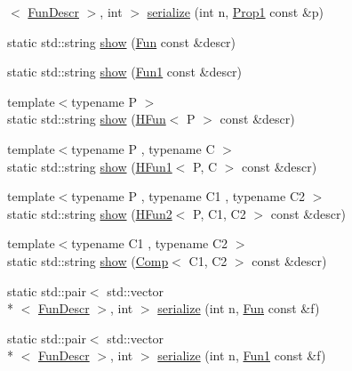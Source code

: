 \begin{DoxyCompactItemize}
$<$ \hyperlink{structpfq__lang_1_1FunDescr}{Fun\+Descr} $>$, int $>$ \hyperlink{namespacepfq__lang_1_1term_a4c143ee066b92bd8578432f7436026fb}{serialize} (int n, \hyperlink{structpfq__lang_1_1term_1_1Prop1}{Prop1} const \&p)
\item 
static std\+::string \hyperlink{namespacepfq__lang_1_1term_a2df94c2f5eb6ffb6ebd83f79b5c8008d}{show} (\hyperlink{structpfq__lang_1_1term_1_1Fun}{Fun} const \&descr)
\item 
static std\+::string \hyperlink{namespacepfq__lang_1_1term_a9d1a9154aa159b08768c01512719b89c}{show} (\hyperlink{structpfq__lang_1_1term_1_1Fun1}{Fun1} const \&descr)
\item 
{\footnotesize template$<$typename P $>$ }\\static std\+::string \hyperlink{namespacepfq__lang_1_1term_ac7f23df160e54271a796e8ccc76f91c7}{show} (\hyperlink{structpfq__lang_1_1term_1_1HFun}{H\+Fun}$<$ P $>$ const \&descr)
\item 
{\footnotesize template$<$typename P , typename C $>$ }\\static std\+::string \hyperlink{namespacepfq__lang_1_1term_ae2a6d9f12c95a5316525427683048cba}{show} (\hyperlink{structpfq__lang_1_1term_1_1HFun1}{H\+Fun1}$<$ P, C $>$ const \&descr)
\item 
{\footnotesize template$<$typename P , typename C1 , typename C2 $>$ }\\static std\+::string \hyperlink{namespacepfq__lang_1_1term_a15b3d8fa4a86e40ae3aa958cf117ed96}{show} (\hyperlink{structpfq__lang_1_1term_1_1HFun2}{H\+Fun2}$<$ P, C1, C2 $>$ const \&descr)
\item 
{\footnotesize template$<$typename C1 , typename C2 $>$ }\\static std\+::string \hyperlink{namespacepfq__lang_1_1term_a456b08214b3ca481370b19c356fe72a1}{show} (\hyperlink{structpfq__lang_1_1term_1_1Comp}{Comp}$<$ C1, C2 $>$ const \&descr)
\item 
static std\+::pair$<$ std\+::vector\\*
$<$ \hyperlink{structpfq__lang_1_1FunDescr}{Fun\+Descr} $>$, int $>$ \hyperlink{namespacepfq__lang_1_1term_aa575bd934906ada0e096c73f4a8c3178}{serialize} (int n, \hyperlink{structpfq__lang_1_1term_1_1Fun}{Fun} const \&f)
\item 
static std\+::pair$<$ std\+::vector\\*
$<$ \hyperlink{structpfq__lang_1_1FunDescr}{Fun\+Descr} $>$, int $>$ \hyperlink{namespacepfq__lang_1_1term_a0a5684fae11ed300d52a262fcfd3dcba}{serialize} (int n, \hyperlink{structpfq__lang_1_1term_1_1Fun1}{Fun1} const \&f)

\end{DoxyCompactItemize}
